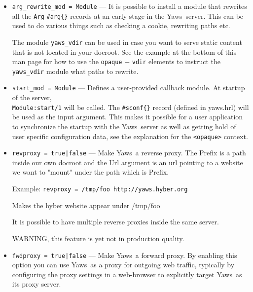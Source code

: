 \documentclass[11pt,oneside,english]{book}
\newcommand{\Yaws}            %
        {{\sc Yaws}}
\begin{document}
\begin{itemize}
\item       \verb+arg_rewrite_mod = Module+ ---
              It is possible to install a module that rewrites all the
              \verb+Arg+ \verb+#arg{}+ records at an early stage in the
              \Yaws\ server.  This can be used to do various things such as
              checking a cookie, rewriting paths etc.

              The module \verb+yaws_vdir+ can be used in case you want to serve
              static content that is not located in your docroot. See the
              example at the bottom of this man page for how to use the
              \verb+opaque+ + \verb+vdir+ elements to instruct the
              \verb+yaws_vdir+ module what paths to rewrite.

\item       \verb+start_mod = Module+ ---
              Defines a user-provided callback module. At startup of the server,\\
              \verb+Module:start/1+ will be called.  The \verb+#sconf{}+ record
              (defined in yaws.hrl) will be used as the input argument. This
              makes it possible for a user application to synchronize the
              startup with the \Yaws\ server as well as getting hold of user
              specific configuration data, see the explanation for the
              \verb+<opaque>+ context.

\item       \verb+revproxy = true|false+ ---
              Make \Yaws\ a reverse proxy. The Prefix is a path inside our own
              docroot and the Url argument is an url pointing to a website we
              want to "mount" under the path which is Prefix.

              Example: \verb+revproxy = /tmp/foo http://yaws.hyber.org+

              Makes the hyber website appear under /tmp/foo

              It is possible to have multiple reverse proxies inside the same
              server.

              WARNING, this feature is yet not in production quality.

\item       \verb+fwdproxy = true|false+ ---
              Make \Yaws\ a forward proxy. By enabling this option you can use
              \Yaws\ as a proxy for outgoing web traffic, typically by
              configuring the proxy settings in a web-browser to explicitly
              target \Yaws\ as its proxy server.


\end{itemize}
\end{document}
